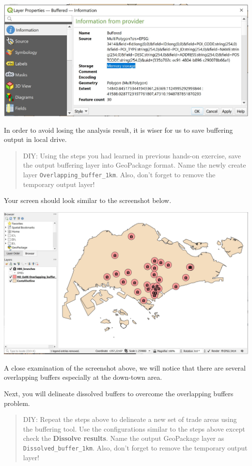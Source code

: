 \documentclass[
  letterpaper,
  DIV=11,
  numbers=noendperiod]{scrreprt}
\begin{document}
\includegraphics{./img05/image17.jpg}

In order to avoid losing the analysis result, it is wiser for us to save
buffering output in local drive.

\begin{quote}
DIY: Using the steps you had learned in previous hands-on exercise, save
the output buffering layer into GeoPackage format. Name the newly create
layer \texttt{Overlapping\_buffer\_1km}. Also, don't forget to remove
the temporary output layer!
\end{quote}

Your screen should look similar to the screenshot below.

\includegraphics{./img05/image18.jpg}

A close examination of the screenshot above, we will notice that there
are several overlapping buffers especially at the down-town area.

Next, you will delineate dissolved buffers to overcome the overlapping
buffers problem.

\begin{quote}
DIY: Repeat the steps above to delineate a new set of trade areas using
the buffering tool. Use the configurations similar to the steps above
except check the \textbf{Dissolve results}. Name the output GeoPackage
layer as \texttt{Dissolved\_buffer\_1km}. Also, don't forget to remove
the temporary output layer!
\end{quote}
\end{document}
